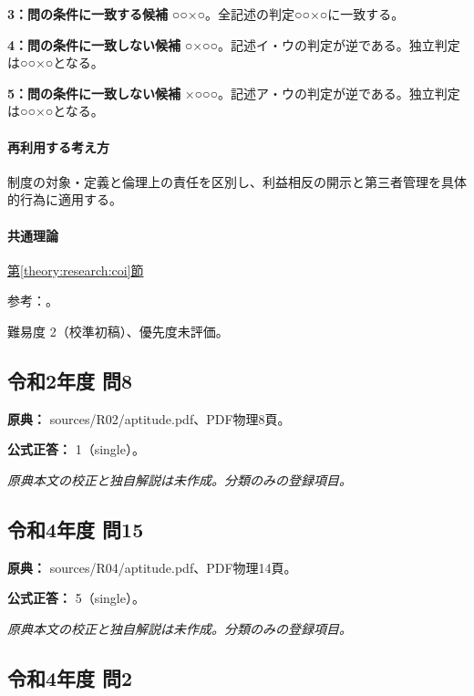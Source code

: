 \noindent\textbf{3：問の条件に一致する候補} ○○×○。全記述の判定○○×○に一致する。\par

\noindent\textbf{4：問の条件に一致しない候補} ○×○○。記述イ・ウの判定が逆である。独立判定は○○×○となる。\par

\noindent\textbf{5：問の条件に一致しない候補} ×○○○。記述ア・ウの判定が逆である。独立判定は○○×○となる。\par

\paragraph{再利用する考え方} 制度の対象・定義と倫理上の責任を区別し、利益相反の開示と第三者管理を具体的行為に適用する。

\paragraph{共通理論} \hyperref[theory:research:coi]{第\ref*{theory:research:coi}節}

\par 参考：\cite{jsps_integrity2025}。

\par 難易度 2（校準初稿）、優先度未評価。

\subsection{令和2年度 問8}
\label{q:r02-reg-apt-08}

\noindent\textbf{原典：} sources/R02/aptitude.pdf、PDF物理8頁。

\textbf{公式正答：} 1（single）。

\par\textit{原典本文の校正と独自解説は未作成。分類のみの登録項目。}

\subsection{令和4年度 問15}
\label{q:r04-reg-apt-15}

\noindent\textbf{原典：} sources/R04/aptitude.pdf、PDF物理14頁。

\textbf{公式正答：} 5（single）。

\par\textit{原典本文の校正と独自解説は未作成。分類のみの登録項目。}

\subsection{令和4年度 問2}
\label{q:r04-reg-apt-02}

